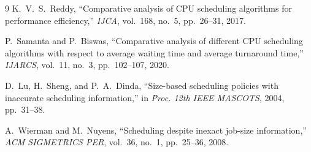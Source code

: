\documentclass[11pt]{article}
\begin{document}
\vspace{0.1em}
\begin{thebibliography}{9}
\footnotesize
\setlength{\itemsep}{-0.35em}
\setlength{\parsep}{0pt}
K.~V.~S.~Reddy, ``Comparative analysis of CPU scheduling algorithms for performance efficiency,'' \textit{IJCA}, vol.~168, no.~5, pp.~26--31, 2017.

P.~Samanta and P.~Biswas, ``Comparative analysis of different CPU scheduling algorithms with respect to average waiting time and average turnaround time,'' \textit{IJARCS}, vol.~11, no.~3, pp.~102--107, 2020.

D.~Lu, H.~Sheng, and P.~A.~Dinda, ``Size-based scheduling policies with inaccurate scheduling information,'' in \textit{Proc. 12th IEEE MASCOTS}, 2004, pp.~31--38.

A.~Wierman and M.~Nuyens, ``Scheduling despite inexact job-size information,'' \textit{ACM SIGMETRICS PER}, vol.~36, no.~1, pp.~25--36, 2008.

\end{thebibliography}
\end{document}
